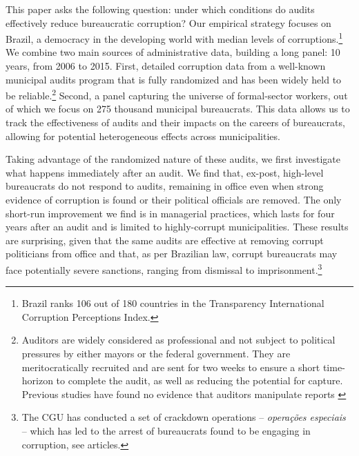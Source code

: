 \documentclass[12pt,a4paper]{article}
\theoremstyle{definition}
\begin{document}
This paper asks the following question: under which conditions do audits effectively reduce bureaucratic corruption? Our empirical strategy focuses on Brazil, a democracy in the developing world with median levels of corruptions.\footnote{Brazil ranks 106 out of 180 countries in the Transparency International Corruption Perceptions Index.} We combine two main sources of administrative data, building a long panel: 10 years, from 2006 to 2015. First, detailed corruption data from a well-known municipal audits program  \citep[studied by e.g.][]{ferraz_exposing_2008, brollo2013political, zamboni_audit_2018} that is fully randomized and has been widely held to be reliable.\footnote{Auditors are widely considered as professional and not subject to political pressures by either mayors or the federal government. They are meritocratically recruited and are sent for two weeks to ensure a short time-horizon to complete the audit, as well as reducing the potential for capture. Previous studies have found no evidence that auditors manipulate reports \citep{avis_government_2018, ferraz_exposing_2008}} Second, a panel capturing the universe of formal-sector workers, out of which we focus on 275 thousand municipal bureaucrats. This data allows us to track the effectiveness of audits and their impacts on the careers of bureaucrats, allowing for potential heterogeneous effects across municipalities.

Taking advantage of the randomized nature of these audits, we first investigate what happens immediately after an audit. We find that, ex-post, high-level bureaucrats do not respond to audits, remaining in office even when strong evidence of corruption is found or their political officials are removed. The only short-run improvement we find is in managerial practices, which lasts for four years after an audit and is limited to highly-corrupt municipalities. These results are surprising, given that the same audits are effective at removing corrupt politicians from office and that, as per Brazilian law, corrupt bureaucrats may face potentially severe sanctions, ranging from dismissal to imprisonment.\footnote{The CGU has conducted a set of crackdown operations -- \emph{operações especiais} -- which has led to the arrest of bureaucrats found to be engaging in corruption, see articles.}
\end{document}
